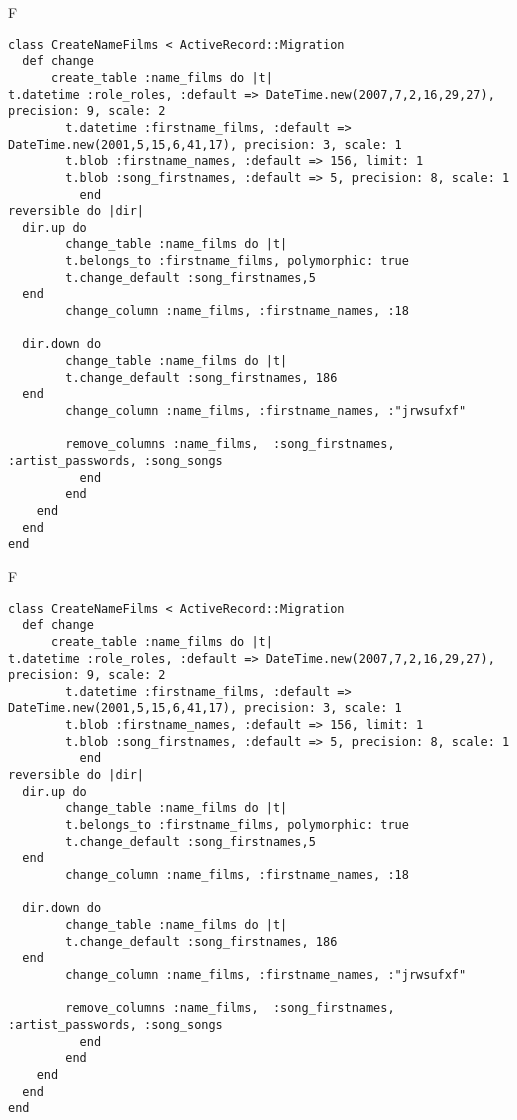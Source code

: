 F
\begin{verbatim}
class CreateNameFilms < ActiveRecord::Migration
  def change
	  create_table :name_films do |t|
t.datetime :role_roles, :default => DateTime.new(2007,7,2,16,29,27), precision: 9, scale: 2
		t.datetime :firstname_films, :default => DateTime.new(2001,5,15,6,41,17), precision: 3, scale: 1
		t.blob :firstname_names, :default => 156, limit: 1
		t.blob :song_firstnames, :default => 5, precision: 8, scale: 1
		  end
reversible do |dir|
  dir.up do
		change_table :name_films do |t|
		t.belongs_to :firstname_films, polymorphic: true
 		t.change_default :song_firstnames,5
  end
 		change_column :name_films, :firstname_names, :18
   
  dir.down do
		change_table :name_films do |t|
		t.change_default :song_firstnames, 186
  end
 		change_column :name_films, :firstname_names, :"jrwsufxf"
   
		remove_columns :name_films,  :song_firstnames, :artist_passwords, :song_songs 
	      end
	    end
    end 
  end
end

\end{verbatim}

F
\begin{verbatim}
class CreateNameFilms < ActiveRecord::Migration
  def change
	  create_table :name_films do |t|
t.datetime :role_roles, :default => DateTime.new(2007,7,2,16,29,27), precision: 9, scale: 2
		t.datetime :firstname_films, :default => DateTime.new(2001,5,15,6,41,17), precision: 3, scale: 1
		t.blob :firstname_names, :default => 156, limit: 1
		t.blob :song_firstnames, :default => 5, precision: 8, scale: 1
		  end
reversible do |dir|
  dir.up do
		change_table :name_films do |t|
		t.belongs_to :firstname_films, polymorphic: true
 		t.change_default :song_firstnames,5
  end
 		change_column :name_films, :firstname_names, :18
   
  dir.down do
		change_table :name_films do |t|
		t.change_default :song_firstnames, 186
  end
 		change_column :name_films, :firstname_names, :"jrwsufxf"
   
		remove_columns :name_films,  :song_firstnames, :artist_passwords, :song_songs 
	      end
	    end
    end 
  end
end

\end{verbatim}
